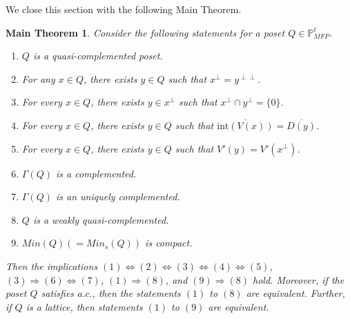 \documentclass[10pt,one side,emlines]{amsart}
\newtheorem*{theorem*}{Main Theorem}
\theoremstyle{definition}
\begin{document}
We close this section with the following Main Theorem. 
\vspace{0.4mm}

\begin{theorem*} \label{1}
	Consider the following statements for a poset $Q\in \mathbb{P}^{\ell}_{MFP}$.
	\begin{enumerate} 
		\item[(1)] $Q$ is a quasi-complemented poset.
		\item[(2)] For any $x \in Q$, there exists $y \in Q$ such that $x^{\perp}= y^{\perp \perp}$.
		\item[(3)] For every $x\in Q$, there exists $y\in x^{\perp}$ such that $x^{\perp}\cap y^{\perp}=\{0\}$.
		\item[(4)] For every $x\in Q$, there exists $y\in Q$ such that $\overline{\text{int}(V(x))}=\overline{D(y)}$.
		\item[(5)] For every $x\in Q$, there exists $y\in Q$ such that $V'(y)=V'(x^{\perp})$.
		\item[(6)] $\Gamma(Q)$ is a complemented.
		\item[(7)] $\Gamma(Q)$ is an uniquely complemented.
		\item[(8)] $Q$ is a weakly quasi-complemented.
		\item[(9)] $Min(Q)  ( = Min_s(Q))$ is compact.
	\end{enumerate}
	Then the implications $(1)\Leftrightarrow (2) \Leftrightarrow (3) \Leftrightarrow (4) \Leftrightarrow (5)$, $(3)\Rightarrow (6)\Leftrightarrow (7)$, $(1)\Rightarrow (8)$, and $(9)\Rightarrow (8)$ hold. Moreover, if the poset $Q$ satisfies $a.c.$, then the statements $(1)$ to $(8)$ are  equivalent. Further,  if $Q$ is a lattice, then statements $(1)$ to $(9)$ are  equivalent.
\end{theorem*} 
\end{document}
